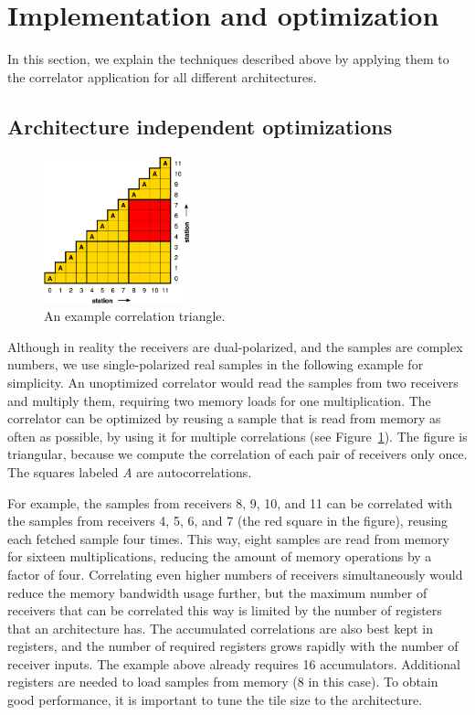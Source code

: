 \documentclass{article}
\begin{document}
\section{Implementation and optimization}
\label{sec:optimizing}

In this section,
we explain the techniques described above by applying them to the
correlator application for all different architectures.


\subsection{Architecture independent optimizations}
\label{sec:tiling}

\begin{figure}[t]
\begin{center}
\includegraphics[width=4.2cm]{figures/correlation-triangle.pdf}
\end{center}
\vspace{-0.5cm}
\caption{An example correlation triangle.}
\label{fig-correlation}
\end{figure}

Although in reality the receivers are dual-polarized, and the samples are complex numbers, 
we use single-polarized real samples in the following example for simplicity.
An unoptimized correlator would read the samples from two receivers and
multiply them, requiring two memory loads for one multiplication.
The correlator can be optimized by reusing a sample that is read from memory
as often as possible, by using it for multiple correlations (see
Figure~\ref{fig-correlation}).
The figure is triangular, because we compute
the correlation of each pair of receivers only once. The squares labeled \emph{A} are
autocorrelations.

For example, the samples from receivers 8, 9, 10, and 11 can be correlated
with the samples from receivers 4, 5, 6, and 7 (the red square in the figure),
reusing each fetched sample four times.
This way, eight samples are read from memory for sixteen
multiplications, reducing the amount of memory operations by a factor
of four.
Correlating even higher numbers of receivers simultaneously would reduce the
memory bandwidth usage further, but the maximum number of receivers that can
be correlated this way is limited by the number of registers that an architecture has.
The accumulated correlations are also best kept in registers, and the number of
required registers grows rapidly with the number of receiver inputs.
The example above already requires 16 accumulators.
Additional registers are needed to load samples from memory (8 in this case).
To obtain good performance, it is important to tune the tile size to the
architecture.
\end{document}
